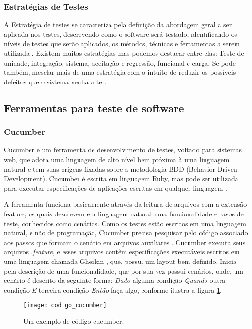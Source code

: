 \documentclass[12pt]{article}
\begin{document}
	\subsubsection{Estratégias de Testes}
	A Estratégia de testes se caracteriza pela definição da abordagem geral a ser aplicada nos testes, descrevendo como o software será testado, identificando os níveis de testes que serão aplicados, os métodos, técnicas e ferramentas a serem utilizada \cite{rios2006teste}. Existem muitas estratégias mas podemos destacar entre elas: Teste de unidade, integração, sistema, aceitação e regressão, funcional e carga. Se pode também, mesclar mais de uma estratégia com o intuito de reduzir os possíveis defeitos que o sistema venha a ter.	

	\subsection{Ferramentas para teste de software}

	\subsubsection{Cucumber}
	Cucumber é um ferramenta de desenvolvimento de testes, voltado para sistemas web, que adota uma linguagem de alto nível bem próxima à uma linguagem natural e tem suas origens fixadas sobre a metodologia BDD (Behavior Driven Development). Cucumber é escrita em linguagem Ruby, mas pode ser utilizada para executar especificações de aplicações escritas em qualquer linguagem \cite{nunescucumber}. 

	A ferramenta funciona basicamente através da leitura de arquivos com a extensão feature, os quais descrevem em linguagem natural uma funcionalidade e casos de teste, conhecidos como cenários.     
	Como os testes estão escritos em uma linguagem natural, e não de programação, Cucumber precisa pesquisar pelo código associado aos passos que formam o cenário em arquivos auxiliares \cite{scmitzcucumberreview}. Cucumber executa seus arquivos \emph{.feature}, e esses arquivos contêm especificações executáveis escritos em uma linguagem chamada Gherkin \cite{cucumberwiki}, que, possui um layout bem definido. Inicia pela descrição de uma funcionalidade, que por sua vez possui cenários, onde, um cenário é descrito da seguinte forma: \emph{Dado} alguma condição \emph{Quando} outra condição \emph{E} terceira condição \emph{Então} faça algo, conforme ilustra a figura \ref{fig:codigo_cucumber}.

	\begin{figure}[!htb]
		\centering
		\texttt{[image: codigo\_cucumber]}
		\caption{Um exemplo de código cucumber.}
		\label{fig:codigo_cucumber}
	\end{figure}
\end{document}
